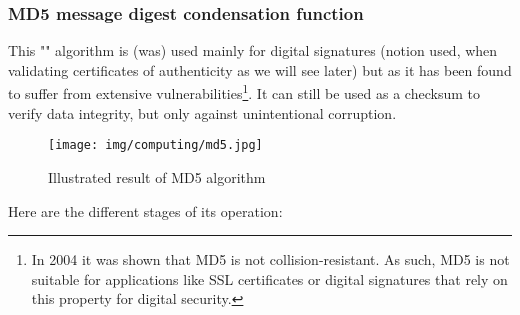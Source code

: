 	\subsubsection{MD5 message digest condensation function}
	This "" algorithm is (was) used mainly for digital signatures (notion used, when validating certificates of authenticity as we will see later) but as it has been found to suffer from extensive vulnerabilities\footnote{In 2004 it was shown that MD5 is not collision-resistant. As such, MD5 is not suitable for applications like SSL certificates or digital signatures that rely on this property for digital security.}. It can still be used as a checksum to verify data integrity, but only against unintentional corruption.
	\begin{figure}[H]
		\centering
		\texttt{[image: img/computing/md5.jpg]}
		\caption{Illustrated result of MD5 algorithm}
	\end{figure}
	Here are the different stages of its operation:
